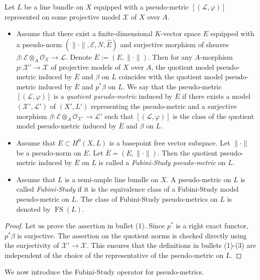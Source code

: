 \documentclass [11pt,reqno]{amsart}
\newcommand{\1}{\mathmybb{1}}
\def\cE{{\mathcal{E}}}
\def\cL{{\mathcal{L}}}
\def\cO{{\mathcal{O}}}
\def\cX{{\mathcal{X}}}
\def\FS{\operatorname{FS}}
\begin{document}
\begin{proposition-definition}
\label{propdef:quotient_local_pseudo-metric}
Let $L$ be a line bundle on $X$ equipped with a pseudo-metric $[(\cL,\varphi)]$ represented on some projective model $\cX$ of $X$ over $A$.
\begin{itemize}
	\item[(1)] Assume that there exist a finite-dimensional $K$-vector space $E$ equipped with a pseudo-norm $(\|\cdot\|,\cE,N,\widehat{E})$ and surjective morphism of sheaves $\beta : \cE \otimes_{A} \cO_{\cX} \to \cL$. Denote $\overline{E}:=(E,\|\cdot\|)$. Then for any $A$-morphism $p:\cX'\to\cX$ of projective models of $X$ over $A$, the quotient model pseudo-metric induced by $\overline{E}$ and $\beta$ on $L$ coincides with the quotient model pseudo-metric induced by $\overline{E}$ and $p^{\ast}\beta$ on $L$. We say that the pseudo-metric $[(\cL,\varphi)]$ is a \emph{quotient pseudo-metric} induced by $\overline{E}$ if there exists a model $(\cX',\cL')$ of $(X',L')$ representing the pseudo-metric and a surjective morphism $\beta : \cE \otimes_{A} \cO_{\cX'} \to \cL'$ such that $[(\cL,\varphi)]$ is the class of the quotient model pseudo-metric induced by $\overline{E}$ and $\beta$ on $L$. 
	\item[(2)] Assume that $E\subset H^{0}(X,L)$ is a basepoint free vector subspace. Let $\|\cdot\|$ be a pseudo-norm on $E$. Let $\overline{E}=(E,\|\cdot\|)$. Then the quotient pseudo-metric induced by $\overline{E}$ on $L$ is called a \emph{Fubini-Study pseudo-metric} on $L$.
	\item[(3)] Assume that $L$ is a semi-ample line bundle on $X$. A pseudo-metric on $L$ is called \emph{Fubini-Study} if it is the equivalence class of a Fubini-Study model pseudo-metric on $L$. The class of Fubini-Study pseudo-metrics on $L$ is denoted by $\FS(L)$.
\end{itemize}
\end{proposition-definition}

\begin{proof}
Let us prove the assertion in bullet (1). Since $p^{\ast}$ is a right exact functor, $p^{\ast}\beta$ is surjective. The assertion on the quotient norms is checked directly using the surjectivity of $\cX'\to\cX$. This ensures that the definitions in bullets (1)-(3) are independent of the choice of the representative of the pseudo-metric on $L$.
\end{proof}

We now introduce the Fubini-Study operator for pseudo-metrics. 
\end{document}
